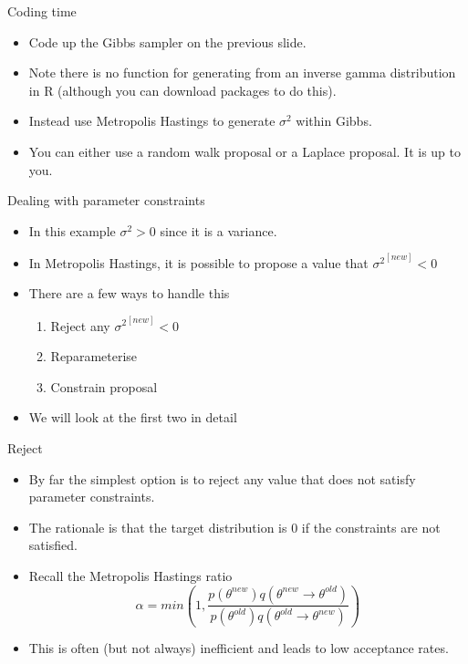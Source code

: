 \documentclass[10pt]{beamer}
\begin{document}
\begin{frame}{Coding time}
  \begin{itemize}
  \item Code up the Gibbs sampler on the previous slide.

  \item Note there is no function for generating from an inverse gamma distribution in R (although you can download packages to do this).

  \item Instead use Metropolis Hastings to generate $\sigma^2$ within Gibbs.

  \item You can either use a random walk proposal or a Laplace proposal.  It is up to you.
  \end{itemize}
\end{frame}
\begin{frame}{Dealing with parameter constraints}
  \begin{itemize}
  \item In this example $\sigma^2>0$ since it is a variance.

  \item In Metropolis Hastings, it is possible to propose a value that ${\sigma^2}^{[new]}<0$

  \item There are a few ways to handle this
    \begin{enumerate}
    \item Reject any ${\sigma^2}^{[new]}<0$
    \item Reparameterise
    \item Constrain proposal
    \end{enumerate}

  \item We will look at the first two in detail
  \end{itemize}
\end{frame}
\begin{frame}{Reject}
  \begin{itemize}
  \item By far the simplest option is to reject any value that does not satisfy parameter constraints.

  \item The rationale is that the target distribution is 0 if the constraints are not satisfied.

  \item Recall the Metropolis Hastings ratio
    \begin{equation}
      \alpha=min\left(1,\frac{p(\theta^{new})q(\theta^{new}\rightarrow\theta^{old})}{p(\theta^{old})q(\theta^{old}\rightarrow\theta^{new})}\right)
    \end{equation}

  \item This is often (but not always) inefficient and leads to low acceptance rates.
  \end{itemize}
\end{frame}
\end{document}

